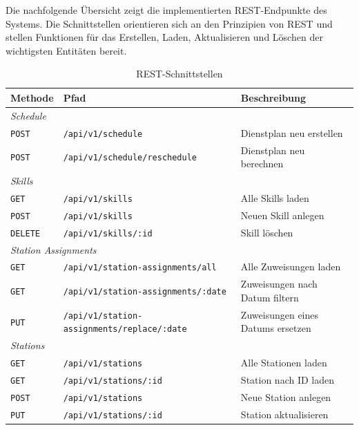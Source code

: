 Die nachfolgende Übersicht zeigt die implementierten REST-Endpunkte des Systems. Die Schnittstellen orientieren sich an den Prinzipien von REST und stellen Funktionen für das Erstellen, Laden, Aktualisieren und Löschen der wichtigsten Entitäten bereit.
\begin{table}[H]
	\centering
	\caption{REST-Schnittstellen}\label{tab:rest-api}
	\begin{tabularx}{\linewidth}{l >{\raggedright\arraybackslash}X >{\raggedright\arraybackslash}X}
		\toprule
		\textbf{Methode} & \textbf{Pfad} & \textbf{Beschreibung} \\
		\midrule
		\multicolumn{3}{l}{\textit{Schedule}} \\
		\midrule
		\texttt{POST}   & \texttt{/api/v1/schedule}                          & Dienstplan neu erstellen \\
		\texttt{POST}   & \texttt{/api/v1/schedule/reschedule}               & Dienstplan neu berechnen \\
		\midrule
		\multicolumn{3}{l}{\textit{Skills}} \\
		\midrule
		\texttt{GET}    & \texttt{/api/v1/skills}                            & Alle Skills laden \\
		\texttt{POST}   & \texttt{/api/v1/skills}                            & Neuen Skill anlegen \\
		\texttt{DELETE} & \texttt{/api/v1/skills/:id}                        & Skill löschen \\
		\midrule
		\multicolumn{3}{l}{\textit{Station Assignments}} \\
		\midrule
		\texttt{GET}    & \texttt{/api/v1/station-assignments/all}           & Alle Zuweisungen laden \\
		\texttt{GET}    & \texttt{/api/v1/station-assignments/:date}               & Zuweisungen nach Datum filtern \\
		\texttt{PUT}    & \texttt{/api/v1/station-assignments/replace/:date} & Zuweisungen eines Datums ersetzen \\
		\midrule
		\multicolumn{3}{l}{\textit{Stations}} \\
		\midrule
		\texttt{GET}    & \texttt{/api/v1/stations}                          & Alle Stationen laden \\
		\texttt{GET}    & \texttt{/api/v1/stations/:id}                      & Station nach ID laden \\
		\texttt{POST}   & \texttt{/api/v1/stations}                          & Neue Station anlegen \\
		\texttt{PUT}    & \texttt{/api/v1/stations/:id}                      & Station aktualisieren \\

\end{tabularx}
\end{table}
